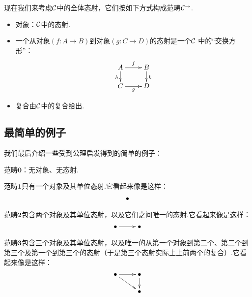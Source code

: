 \begin{exam}
  现在我们来考虑${\cal C}$中的全体态射，它们按如下方式构成范畴${\cal C}^{\to}$.
  \begin{itemize}
    \item 对象：${\cal C}$中的态射.
    \item 一个从对象$(f\colon A \to B)$到对象$(g\colon C \to D)$的态射是一个${\cal C}$ 中的“交换方形”：
               \begin{displaymath}
                 \xymatrix@R=0.5cm{
                    A\ar[d]_{h}\ar[r]^{f} & B\ar[d]^{k} \\
                    C\ar[r]_{g}&D                }
               \end{displaymath}
    \item 复合由${\cal C}$中的复合给出.
  \end{itemize}
\end{exam}

\subsection{最简单的例子}
我们最后介绍一些受到公理启发得到的简单的例子：
\begin{exam}
  范畴$\mathbf{0}$：无对象、无态射.

  范畴$\mathbf{1}$只有一个对象及其单位态射.它看起来像是这样：
               \begin{displaymath}
                 \xymatrix@R=0.5cm{
                    \bullet              }
               \end{displaymath}

  范畴$\mathbf{2}$包含两个对象及其单位态射，以及它们之间唯一的态射.它看起来像是这样：
               \begin{displaymath}
                 \xymatrix@R=0.5cm{
                    \bullet\ar[r] & \bullet             }
               \end{displaymath}

  范畴$\mathbf{3}$包含三个对象及其单位态射，以及唯一的从第一个对象到第二个、第二个到第三个及第一个到第三个的态射（于是第三个态射实际上上前两个的复合）.它看起来像是这样：
               \begin{displaymath}
                 \xymatrix@R=0.5cm{
                    \bullet\ar[r]\ar[dr] & \bullet\ar[d] \\
                    & \bullet            }
               \end{displaymath}
\end{exam}

